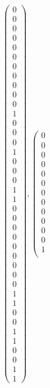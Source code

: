\documentclass[8pt]{article}
\begin{document}
 \newline \begin{align*}
 \left(\begin{array}{r}
0 \\
0 \\
0 \\
0 \\
0 \\
0 \\
0 \\
0 \\
0 \\
0 \\
0 \\
1 \\
0 \\
0 \\
0 \\
1 \\
0 \\
0 \\
0 \\
1 \\
1 \\
0 \\
0 \\
0 \\
0 \\
0 \\
0 \\
0 \\
0 \\
0 \\
1 \\
1 \\
0 \\
0 \\
1 \\
1 \\
0 \\
0 \\
1 \\
1
\end{array}\right) ,
 \left(\begin{array}{r}
0 \\
0 \\
0 \\
0 \\
0 \\
0 \\
0 \\
0 \\
0 \\
0 \\
0 \\
0 \\
1 \\

\end{array}
\end{align*}
\end{document}
